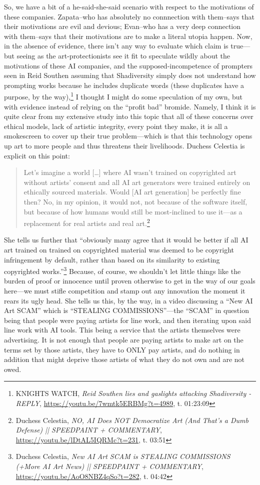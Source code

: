 \documentclass[11pt]{article}
\begin{document}
So, we have a bit of a he-said-she-said scenario with respect to the motivations of these companies. Zapata--who has absolutely no connnection with them--says that their motivations are evil and devious; Evan--who has a very deep connection with them--says that their motivations are to make a literal utopia happen. Now, in the absence of evidence, there isn't any way to evaluate which claim is true---but seeing as the art-protectionists see it fit to speculate wildly about the motivations of these AI companies, and the supposed-incompetence of prompters seen in Reid Southen assuming that Shadiversity simply does not understand how prompting works because he includes duplicate words (these duplicates have a purpose, by the way),\footnote{KNIGHTS WATCH, \emph{Reid Southen lies and gaslights attacking Shadiversity - REPLY}, \url{https://youtu.be/7wmtk5ERBMg?t=4989}, t. 01:23:09} I thought I might do some speculation of my own, but with evidence instead of relying on the ``profit bad'' bromide. Namely, I think it is quite clear from my extensive study into this topic that all of these concerns over ethical models, lack of artistic integrity, every point they make, it is all a smokescreen to cover up their true problem---which is that this technology opens up art to more people and thus threatens their livelihoods. Duchess Celestia is explicit on this point:

\begin{quote}
Let's imagine a world [\ldots{}] where AI wasn't trained on copyrighted art without artists' consent and all AI art generators were trained entirely on ethically sourced materials. Would [AI art generation] be perfectly fine then? No, in my opinion, it would not, not because of the software itself, but because of how humans would still be most-inclined to use it---as a replacement for real artists and real art.\footnote{Duchess Celestia, \emph{NO, AI Does NOT Democratize Art (And That's a Dumb Defense) || SPEEDPAINT + COMMENTARY}, \url{https://youtu.be/lDtAL5IQRMc?t=231}, t. 03:51}
\end{quote}

She tells us further that ``obviously many agree that it would be better if all AI art trained on trained on copyrighted material was deemed to be copyright infringement by default, rather than based on its similarity to existing copyrighted works.''\footnote{Duchess Celestia, \emph{New AI Art SCAM is STEALING COMMISSIONS (+More AI Art News) || SPEEDPAINT + COMMENTARY}, \url{https://youtu.be/AoO8NBZ4qSo?t=282}, t. 04:42} Because, of course, we shouldn't let little things like the burden of proof or innocence until proven otherwise to get in the way of our goals here---we must stifle competition and stamp out any innovation the moment it rears its ugly head. She tells us this, by the way, in a video discussing a ``New AI Art SCAM'' which is ``STEALING COMMISSIONS''---the ``SCAM'' in question being that people were paying artists for line work, and then iterating upon said line work with AI tools. This being a service that the artists themselves were advertising. It is not enough that people are paying artists to make art on the terms set by those artists, they have to ONLY pay artists, and do nothing in addition that might deprive those artists of what they do not own and are not owed.
\end{document}
